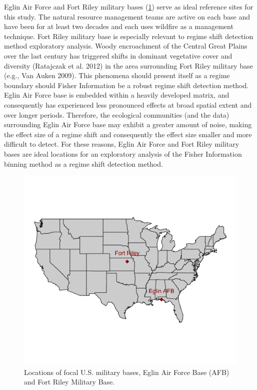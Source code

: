 \documentclass[12pt,twoside,openany]{reedthesis}
\begin{document}
Eglin Air Force and Fort Riley military bases
(\ref{fig:basesOfInterestMap}) serve as ideal reference sites for this
study. The natural resource management teams are active on each base and
have been for at least two decades and each uses wildfire as a
management technique. Fort Riley military base is especially relevant to
regime shift detection method exploratory analysis. Woody encroachment
of the Central Great Plains over the last century has triggered shifts
in dominant vegetative cover and diversity (Ratajczak et al. 2012) in
the area surrounding Fort Riley military base (e.g., Van Auken 2009).
This phenomena should present itself as a regime boundary should Fisher
Information be a robust regime shift detection method. Eglin Air Force
base is embedded within a heavily developed matrix, and consequently has
experienced less pronounced effects at broad spatial extent and over
longer periods. Therefore, the ecological communities (and the data)
surrounding Eglin Air Force base may exhibit a greater amount of noise,
making the effect size of a regime shift and consequently the effect
size smaller and more difficult to detect. For these reasons, Eglin Air
Force and Fort Riley military bases are ideal locations for an
exploratory analysis of the Fisher Information binning method as a
regime shift detection method.
\begin{figure}

{\centering \includegraphics[width=0.85\linewidth]{./chapterFiles/fisherSpatial/figures/figsCalledInDiss/basesOfInterestMap} 

}

\caption{Locations of focal U.S. military bases, Eglin Air Force Base (AFB) and Fort Riley Military Base.}\label{fig:basesOfInterestMap}
\end{figure}
\end{document}
